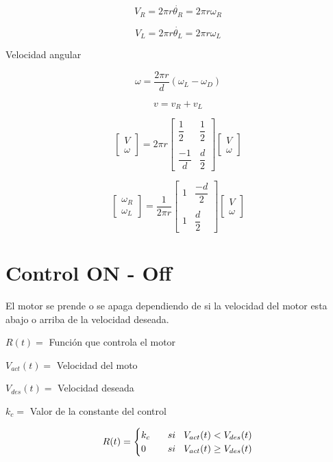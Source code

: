 	
$$V_{R}=2\pi r \dot{\theta_{R}} = 2 \pi r \omega_{R} $$

$$V_{L}=2\pi r \dot{\theta_{L}} = 2 \pi r \omega_{L} $$

Velocidad angular

$$\omega = \frac{2\pi r}{d}(\omega_{L}-\omega_{D})$$

$$v=v_{R} + v_{L}$$

$$
\begin{bmatrix}
V \\
\omega
\end{bmatrix} = 2 \pi r \begin{bmatrix} \dfrac{1}{2} & \dfrac{1}{2} \\ \\ \dfrac{-1}{d} & \dfrac{d}{2} 
\end{bmatrix} \begin{bmatrix} V \\ \omega
\end{bmatrix}
$$

$$
\begin{bmatrix}
\omega_{R} \\
\omega_{L}
\end{bmatrix} = \dfrac{1}{2\pi r} \begin{bmatrix} 1 & \dfrac{-d}{2} \\
 \\ 1 & \dfrac{d}{2} 
\end{bmatrix} \begin{bmatrix} V \\ \omega
\end{bmatrix}
$$



\section{Control ON - Off}
El motor se prende o se apaga dependiendo de si la velocidad del motor esta abajo o arriba de la velocidad deseada.

$R(t) = $ Función que controla el motor

$V_{act}(t) = $ Velocidad del moto

$V_{des}(t) = $ Velocidad deseada

$k_{c} = $ Valor de la constante del control

$$
R(t) = \begin{cases}
k_{c}  \hspace{0.3cm}  & si \hspace{0.3cm}  V_{act}(t) < V_{des}(t) \\
0 & si  \hspace{0.3cm}  V_{act}(t) \geq V_{des}(t)
\end{cases}
$$

